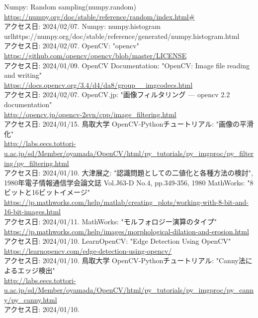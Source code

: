\documentclass[uplatex, report, a4j, 10pt]{jsbook}
\begin{document}
\begin{thebibliography}{0}
  Numpy: Random sampling(numpy.random)\\\url{https://numpy.org/doc/stable/reference/random/index.html#}\\アクセス日: 2024/02/07.
  Numpy: numpy.histogram\\url{https://numpy.org/doc/stable/reference/generated/numpy.histogram.html}\\アクセス日: 2024/02/07.
  OpenCV: "opencv"\\\url{https://github.com/opencv/opencv/blob/master/LICENSE}\\アクセス日: 2024/01/09.
  OpenCV Documentation: "OpenCV: Image file reading and writing" \\\url{https://docs.opencv.org/3.4/d4/da8/group__imgcodecs.html}\\アクセス日: 2024/02/07.
  OpenCV.jp: "画像フィルタリング — opencv 2.2 documentation"\\\url{http://opencv.jp/opencv-2svn/cpp/image_filtering.html}\\アクセス日: 2024/01/15.
  鳥取大学 OpenCV-Pythonチュートリアル: "画像の平滑化"\\\url{http://labs.eecs.tottori-u.ac.jp/sd/Member/oyamada/OpenCV/html/py_tutorials/py_imgproc/py_filtering/py_filtering.html}\\アクセス日: 2024/01/10.
  大津展之: "認識問題としての二値化と各種方法の検討", 1980年電子情報通信学会論文誌 Vol.J63-D No.4, pp.349-356, 1980
  MathWorks: "8ビットと16ビットイメージ"\\\url{https://jp.mathworks.com/help/matlab/creating_plots/working-with-8-bit-and-16-bit-images.html}\\アクセス日: 2024/01/11.
  MathWorks: "モルフォロジー演算のタイプ"\\\url{https://jp.mathworks.com/help/images/morphological-dilation-and-erosion.html}\\アクセス日: 2024/01/10.
  LearnOpenCV: "Edge Detection Using OpenCV"\\\url{https://learnopencv.com/edge-detection-using-opencv/}\\アクセス日: 2024/01/10.
  鳥取大学 OpenCV-Pythonチュートリアル: "Canny法によるエッジ検出"\\\url{http://labs.eecs.tottori-u.ac.jp/sd/Member/oyamada/OpenCV/html/py_tutorials/py_imgproc/py_canny/py_canny.html}\\アクセス日: 2024/01/10.

\end{thebibliography}
\end{document}
